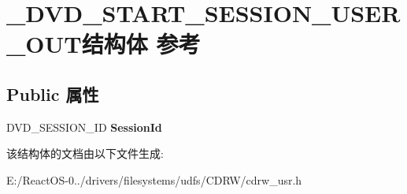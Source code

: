 \hypertarget{struct___d_v_d___s_t_a_r_t___s_e_s_s_i_o_n___u_s_e_r___o_u_t}{}\section{\+\_\+\+D\+V\+D\+\_\+\+S\+T\+A\+R\+T\+\_\+\+S\+E\+S\+S\+I\+O\+N\+\_\+\+U\+S\+E\+R\+\_\+\+O\+U\+T结构体 参考}
\label{struct___d_v_d___s_t_a_r_t___s_e_s_s_i_o_n___u_s_e_r___o_u_t}
\subsection*{Public 属性}
\begin{DoxyCompactItemize}
\item 
\mbox{\label{struct___d_v_d___s_t_a_r_t___s_e_s_s_i_o_n___u_s_e_r___o_u_t_aee2b08e07223a002c434b6da1da00dda}} 
D\+V\+D\+\_\+\+S\+E\+S\+S\+I\+O\+N\+\_\+\+ID {\bfseries Session\+Id}
\end{DoxyCompactItemize}


该结构体的文档由以下文件生成\+:\begin{DoxyCompactItemize}
\item 
E\+:/\+React\+O\+S-\/0../drivers/filesystems/udfs/\+C\+D\+R\+W/cdrw\+\_\+usr.\+h\end{DoxyCompactItemize}
